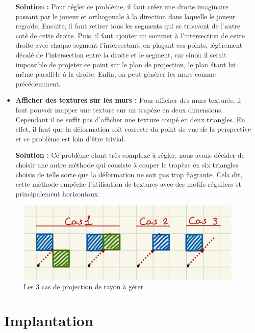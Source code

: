 \documentclass[11pt]{article}
\begin{document}
\begin{itemize}
	\textbf{Solution : }Pour régler ce problème, il faut créer une droite imaginaire passant par le 
	joueur et orthogonale à la direction dans laquelle le joueur regarde. Ensuite, il faut retirer
	tous les segments qui se trouvent de l'autre coté de cette droite. Puis, il faut ajouter un sommet
	à l'intersection de cette droite avec chaque segment l'intersectant, en plaçant ces points, 
	légèrement décalé de l'intersection entre la droite et le segment, car sinon il serait impossible de
	projeter ce point sur le plan de projection, le plan étant lui même parallèle à la droite. Enfin, 
	on peut générer les murs comme précédemment.

	\item \textbf{Afficher des textures sur les murs :} Pour afficher des murs texturés, il faut
	pouvoir mapper une texture sur un trapèze en deux dimensions. Cependant il ne suffit pas d'afficher 
	une texture coupé en deux triangles. En effet, il faut que la déformation soit correcte
	du point de vue de la perspective et ce problème est loin d'être trivial.

	\textbf{Solution : }Ce problème étant très complexe à régler, nous avons décider de choisir
	une autre méthode qui consiste à couper le trapèze en six triangles choisis de telle 
	sorte que la déformation ne soit pas trop flagrante. Cela dit, cette méthode empêche 
	l'utilisation de textures avec des motifs réguliers et principalement horizontaux.
\end{itemize}
\begin{figure}
	\center\begin{minipage}{\textwidth}
		\center\includegraphics[width=\linewidth]{image/3cas-dda.jpeg}
		\caption{Les 3 cas de projection de rayon à gérer}
		\label{fig:3cas-dda}
	\end{minipage}
\end{figure}




\section{Implantation}
\end{document}

